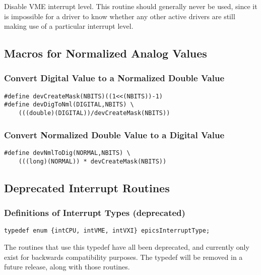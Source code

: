 Disable VME interrupt level. This routine should generally never be used, since it is impossible for a driver to know 
whether any other active drivers are still making use of a particular interrupt level.

\subsection{Macros for Normalized Analog Values}

\subsubsection{Convert Digital Value to a Normalized Double Value}

\begin{verbatim}
#define devCreateMask(NBITS)((1<<(NBITS))-1)
#define devDigToNml(DIGITAL,NBITS) \
    (((double)(DIGITAL))/devCreateMask(NBITS))
\end{verbatim}

\subsubsection{Convert Normalized Double Value to a Digital Value}

\begin{verbatim}
#define devNmlToDig(NORMAL,NBITS) \
    (((long)(NORMAL)) * devCreateMask(NBITS))
\end{verbatim}

\subsection{Deprecated Interrupt Routines}

\subsubsection{Definitions of Interrupt Types (deprecated)}

\begin{verbatim}
typedef enum {intCPU, intVME, intVXI} epicsInterruptType;
\end{verbatim}

The routines that use this typedef have all been deprecated, and currently only exist for backwards compatibility purposes. 
The typedef will be removed in a future release, along with those routines.

